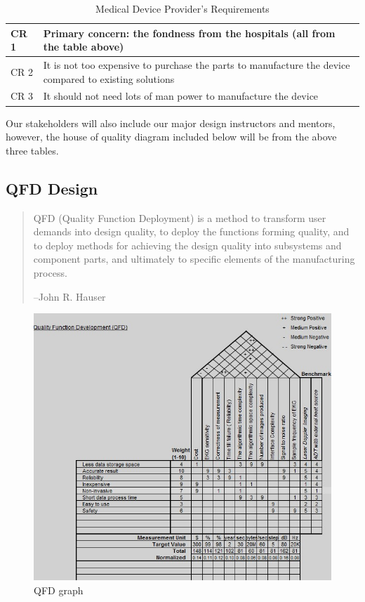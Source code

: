 \documentclass[paper=letter, fontsize=11pt]{scrartcl}
\numberwithin{equation}{section}		%
\numberwithin{figure}{section}			%
\numberwithin{table}{section}			%
\begin{document}
\begin {table}[H]
\centering
\begin{tabular}{l|p{12cm}}
CR 1 & Primary concern: the fondness from the hospitals (all from the table above) \\ \hline
CR 2 & It is not too expensive to purchase the parts to manufacture the device compared to existing solutions\\ \hline
CR 3 & It should not need lots of man power to manufacture the device \\ \hline
\end{tabular}
\caption{Medical Device Provider's Requirements}
\label{Medical Devices CR}
\end {table}

Our stakeholders will also include our major design instructors and mentors, however, the house of quality diagram included below will be from the above three tables.

\subsection{QFD Design}
\begin{quotation}
QFD (Quality Function Deployment) is a method to transform user demands into design quality, to deploy the functions forming quality, and to deploy methods for achieving the design quality into subsystems and component parts, and ultimately to specific elements of the manufacturing process.

\hfill --John R. Hauser
\end{quotation}

\begin{figure}[H]
    \centering
	\includegraphics[scale=1]{qfd.png}
	\caption{QFD graph}
\end{figure}
\end{document}
